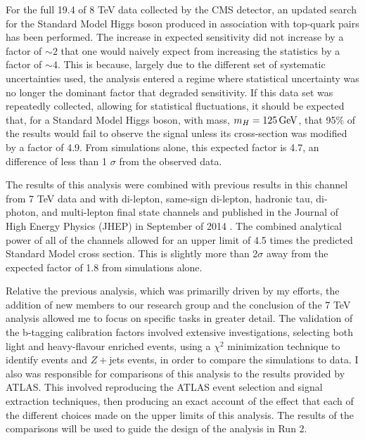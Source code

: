 \par  For the full 19.4 \fbinv of 8 TeV data collected by the CMS
detector, an updated search for the Standard Model Higgs boson produced in
association with top-quark pairs has been performed.  The increase in
expected sensitivity did not increase by a factor of $\sim2$ that one
would naively expect from increasing the statistics by a factor of
$\sim4$.  This is because, largely due to the different set of
systematic uncertainties used, the analysis entered a regime where
statistical uncertainty was no longer the dominant factor that
degraded sensitivity.  If this data set was repeatedly
collected, allowing for statistical fluctuations, it should be
expected that, for a Standard Model Higgs boson, with mass, $m_{H} =
125 \,\text{Ge\hspace{-.08em}V}$, that 95$\%$ of the results would fail to observe the \ttH
signal unless its cross-section was modified by a factor of 4.9.  From
simulations alone, this expected factor is 4.7, an difference of less
than 1 $\sigma$ from the observed data.    

\par The results of this analysis were combined with previous results
in this channel from 7 TeV data and with di-lepton, same-sign
di-lepton, hadronic tau, di-photon, and multi-lepton final state
channels and published in the Journal of High Energy Physics (JHEP) in
September of 2014 \cite{Khachatryan:2014qaa}.  The combined analytical power
of all of the channels allowed for an upper limit of 4.5 times
the predicted Standard Model cross section.  This is slightly more than
2$\sigma$ away from the expected factor of 1.8 from simulations
alone.  

\par Relative the previous analysis, which was primarilly driven by my
efforts, the addition of new members to our research group and the
conclusion of the 7 TeV analysis allowed me to focus on specific tasks
in greater detail.  The validation of the b-tagging calibration
factors involved extensive investigations, selecting both light and
heavy-flavour enriched events, using a $\chi^{2}$ minimization
technique to identify \ttjets events and $Z+$jets events, in order to
compare the simulations to data.  I also was responsible for
comparisons of this analysis to the results provided by ATLAS.  This
involved reproducing the ATLAS event selection and signal extraction
techniques, then producing an exact account of the effect that each of
the different choices made on the upper limits of this analysis.  The
results of the comparisons will be used to guide the design of the
analysis in Run 2.   